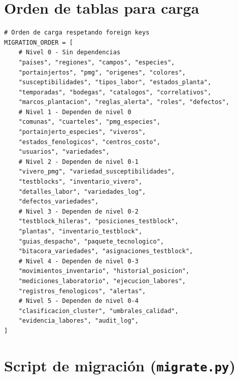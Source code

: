 \documentclass[12pt,a4paper,twoside]{report}
\begin{document}
\section{Orden de tablas para carga}

\begin{lstlisting}[style=pythonstyle, caption={Orden topol\'ogico de carga}]
# Orden de carga respetando foreign keys
MIGRATION_ORDER = [
    # Nivel 0 - Sin dependencias
    "paises", "regiones", "campos", "especies",
    "portainjertos", "pmg", "origenes", "colores",
    "susceptibilidades", "tipos_labor", "estados_planta",
    "temporadas", "bodegas", "catalogos", "correlativos",
    "marcos_plantacion", "reglas_alerta", "roles", "defectos",
    # Nivel 1 - Dependen de nivel 0
    "comunas", "cuarteles", "pmg_especies",
    "portainjerto_especies", "viveros",
    "estados_fenologicos", "centros_costo",
    "usuarios", "variedades",
    # Nivel 2 - Dependen de nivel 0-1
    "vivero_pmg", "variedad_susceptibilidades",
    "testblocks", "inventario_vivero",
    "detalles_labor", "variedades_log",
    "defectos_variedades",
    # Nivel 3 - Dependen de nivel 0-2
    "testblock_hileras", "posiciones_testblock",
    "plantas", "inventario_testblock",
    "guias_despacho", "paquete_tecnologico",
    "bitacora_variedades", "asignaciones_testblock",
    # Nivel 4 - Dependen de nivel 0-3
    "movimientos_inventario", "historial_posicion",
    "mediciones_laboratorio", "ejecucion_labores",
    "registros_fenologicos", "alertas",
    # Nivel 5 - Dependen de nivel 0-4
    "clasificacion_cluster", "umbrales_calidad",
    "evidencia_labores", "audit_log",
]
\end{lstlisting}

\section{Script de migraci\'on (\texttt{migrate.py})}
\end{document}
